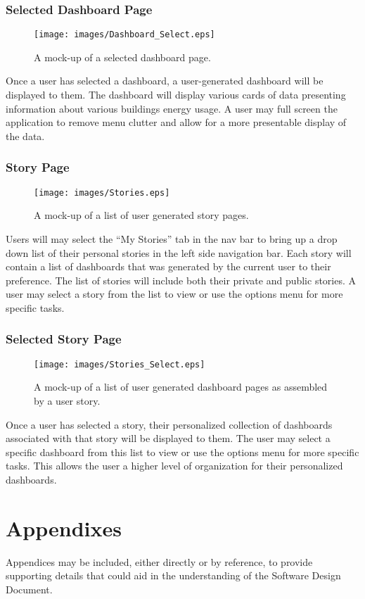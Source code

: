 \documentclass[journal,10pt,onecolumn,compsoc]{IEEEtran}
\begin{document}
    \subsubsection{Selected Dashboard Page}
    \begin{figure}[H]
        \centering
        \texttt{[image: images/Dashboard\_Select.eps]}
        \caption{A mock-up of a selected dashboard page.}
    \end{figure}
	Once a user has selected a dashboard, a user-generated dashboard will be displayed to them.
	The dashboard will display various cards of data presenting information about various buildings energy usage.
	A user may full screen the application to remove menu clutter and allow for a more presentable display of the data.
	
    \subsubsection{Story Page}
    \begin{figure}[H]
        \centering
        \texttt{[image: images/Stories.eps]}
        \caption{A mock-up of a list of user generated story pages.}
    \end{figure}
	Users will may select the ``My Stories'' tab in the nav bar to bring up a drop down list of their personal stories in the left side navigation bar.
	Each story will contain a list of dashboards that was generated by the current user to their preference. 
	The list of stories will include both their private and public stories.
	A user may select a story from the list to view or use the options menu for more specific tasks.
	
    \subsubsection{Selected Story Page}
    \begin{figure}[H]
        \centering
        \texttt{[image: images/Stories\_Select.eps]}
        \caption{A mock-up of a list of user generated dashboard pages as assembled by a user story.}
    \end{figure}
	Once a user has selected a story, their personalized collection of dashboards associated with that story will be displayed to them.
	The user may select a specific dashboard from this list to view or use the options menu for more specific tasks.
	This allows the user a higher level of organization for their personalized dashboards.
	
    \section{Appendixes}
    Appendices may be included, either directly or by reference, to provide supporting details
    that could aid in the understanding of the Software Design Document. 
    
    
\end{document}
